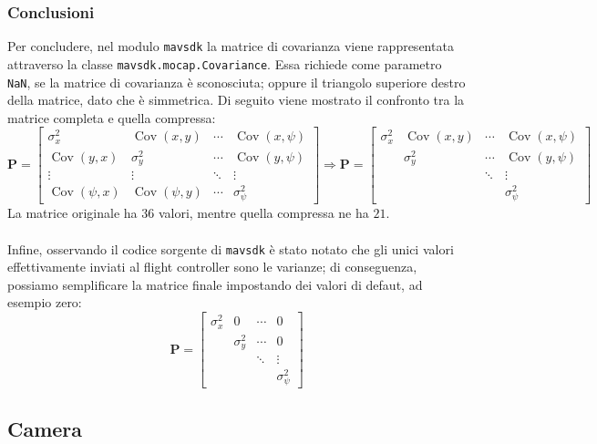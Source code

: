 \subsubsection{Conclusioni}
Per concludere, nel modulo \texttt{mavsdk} la matrice di covarianza viene rappresentata attraverso la classe \texttt{mavsdk.mocap.Covariance}. Essa richiede come parametro \texttt{NaN}, se la matrice di covarianza è sconosciuta; oppure il triangolo superiore destro della matrice, dato che è simmetrica. Di seguito viene mostrato il confronto tra la matrice completa e quella compressa:
\[
\mathbf{P} =
\begin{bmatrix}
	\sigma_x^2 & \operatorname{Cov}(x,y) & \cdots & \operatorname{Cov}(x,\psi) \\
	\operatorname{Cov}(y,x) & \sigma_y^2 & \cdots & \operatorname{Cov}(y,\psi) \\
	\vdots & \vdots & \ddots & \vdots \\
	\operatorname{Cov}(\psi,x) & \operatorname{Cov}(\psi,y) & \cdots & \sigma_\psi^2
\end{bmatrix}
\Rightarrow
\mathbf{P} =
\begin{bmatrix}
	\sigma_x^2 & \operatorname{Cov}(x,y) & \cdots & \operatorname{Cov}(x,\psi) \\
			 & \sigma_y^2 & \cdots & \operatorname{Cov}(y,\psi) \\
	 &  & \ddots & \vdots \\
	&  &  & \sigma_\psi^2
\end{bmatrix}
\]
La matrice originale ha $36$ valori, mentre quella compressa ne ha $21$. \\ \\
Infine, osservando il codice sorgente di \texttt{mavsdk} è stato notato che gli unici valori effettivamente inviati al flight controller sono le varianze; di conseguenza, possiamo semplificare la matrice finale impostando dei valori di defaut, ad esempio zero:
\[
\boxed{
	\mathbf{P} =
	\begin{bmatrix}
		\sigma_x^2 & 0 & \cdots & 0 \\
		& \sigma_y^2 & \cdots & 0 \\
		&  & \ddots & \vdots \\
		&  &  & \sigma_\psi^2
	\end{bmatrix}
}
\]

\subsection{Camera}
\label{sec:vo:camera}

